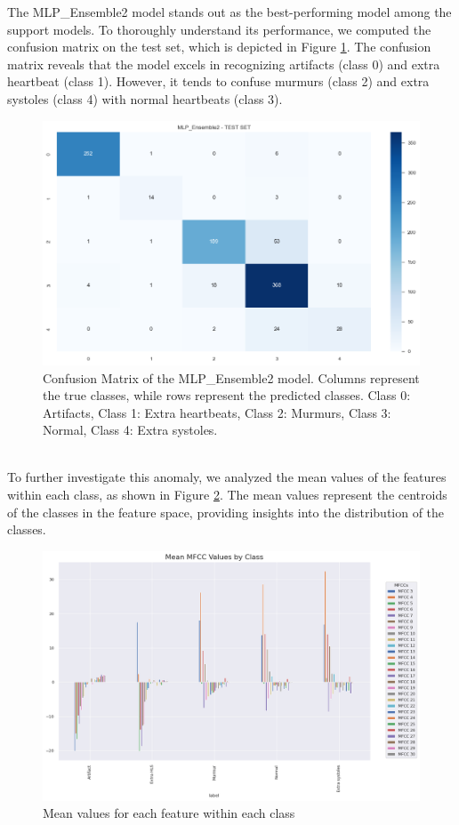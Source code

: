 The MLP\_Ensemble2 model stands out as the best-performing model among the support models.
To thoroughly understand its performance, we computed the confusion matrix on the test set, which is depicted in Figure \ref{fig:support_models_conf_matrix}.
The confusion matrix reveals that the model excels in recognizing artifacts (class 0) and extra heartbeat (class 1).
However, it tends to confuse murmurs (class 2) and extra systoles (class 4) with normal heartbeats (class 3).
\begin{figure}[h]
    \centering
    \includegraphics[width=\columnwidth]{../images/support_models_conf_matrix.png}
    \caption{Confusion Matrix of the MLP\_Ensemble2 model. Columns represent the true classes, while rows represent the predicted classes. Class 0: Artifacts, Class 1: Extra heartbeats, Class 2: Murmurs, Class 3: Normal, Class 4: Extra systoles.}
    \label{fig:support_models_conf_matrix}
\end{figure}
\noindent
\\To further investigate this anomaly, we analyzed the mean values of the features within each class, as shown in Figure \ref{fig:mean_val_for_features}.
The mean values represent the centroids of the classes in the feature space, providing insights into the distribution of the classes.
\begin{figure}[h]
    \centering
    \includegraphics[width=\columnwidth]{../images/mean_val_for_features.png}
    \caption{Mean values for each feature within each class}
    \label{fig:mean_val_for_features}
\end{figure}
